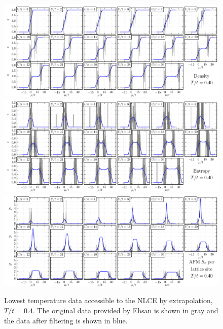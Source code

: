 \begin{figure}
    \centering
\includegraphics[width=1.0\textwidth]{../figures/hubbard-data/dataplots/NLCE8_Final/density/T0_40.png}
\includegraphics[width=1.0\textwidth]{../figures/hubbard-data/dataplots/NLCE8_Final/entropy/T0_40.png}
\includegraphics[width=1.0\textwidth]{../figures/hubbard-data/dataplots/NLCE8_Final/spi/T0_40.png}
\caption{Lowest temperature data accessible to the NLCE by extrapolation,
$T/t=0.4$.  The original data provided by Ehsan is shown in gray and the data
after filtering is shown in blue.}
\label{fig:NLCE_T0.40}
\end{figure}

